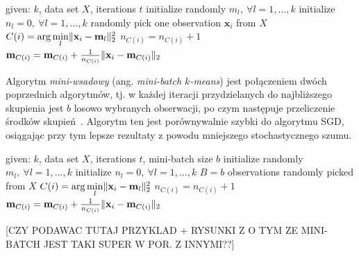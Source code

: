 \documentclass{praca1}
\DeclarePairedDelimiter{\norm}{\lVert}{\rVert}
\begin{document}
\begin{algorithm}[h!]
\begin{algorithmic}[1]
		\State given: $k$, data set $X$, iterations $t$
        \State initialize randomly $m_l, \ \forall l=1, ..., k$
        \State initialize $n_l = 0, \ \forall l=1, ..., k$
        	\State randomly pick one observation $\mathbf{x}_i$ from $X$
                \State $C(i) = \arg \min\limits_{l} \norm{\mathbf{x}_i - \mathbf{m}_l }_2^2 $
                \State $n_{C(i)} = n_{C(i)} + 1$
                \State $\mathbf{m}_{C(i)} = \mathbf{m}_{C(i)} + \frac{1}{n_{C(i)}}\norm{\mathbf{x}_i - \mathbf{m}_{C(i)}}_2$
       \EndFor
\end{algorithmic}
\caption{Algorytm SGD $k$-średnich}\label{alg:002}
\end{algorithm}

Algorytm \emph{mini-wsadowy} (ang. \emph{mini-batch $k$-means}) jest połączeniem dwóch poprzednich algorytmów, tj. w każdej iteracji przydzielanych do najbliższego skupienia jest $b$ losowo wybranych obserwacji, po czym następuje przeliczenie środków skupień~\cite{Sculley2010:webkmeans}. Algorytm ten jest porównywalnie szybki do algorytmu SGD, osiągając przy tym lepsze rezultaty z powodu mniejszego stochastycznego szumu.

\begin{algorithm}[h!]
\begin{algorithmic}[1]
		\State given: $k$, data set $X$, iterations $t$, mini-batch size $b$
        \State initialize randomly $m_l, \ \forall l=1, ..., k$
        \State initialize $n_l = 0, \ \forall l=1, ..., k$
        	\State $B = b$ observations randomly picked from $X$
                \State $C(i) = \arg \min\limits_{l} \norm{\mathbf{x}_i - \mathbf{m}_l }_2^2 $
            \EndFor
                \State $n_{C(i)} = n_{C(i)} + 1$
                \State $\mathbf{m}_{C(i)} = \mathbf{m}_{C(i)} + \frac{1}{n_{C(i)}}\norm{\mathbf{x}_i - \mathbf{m}_{C(i)}}_2$
            \EndFor
       \EndFor
\end{algorithmic}
\caption{Algorytm mini-wsadowy $k$-średnich}\label{alg:003}
\end{algorithm}

[CZY PODAWAC TUTAJ PRZYKLAD + RYSUNKI Z \cite{Sculley2010:webkmeans} O TYM ZE MINI-BATCH JEST TAKI SUPER W POR. Z INNYMI??]
\end{document}
